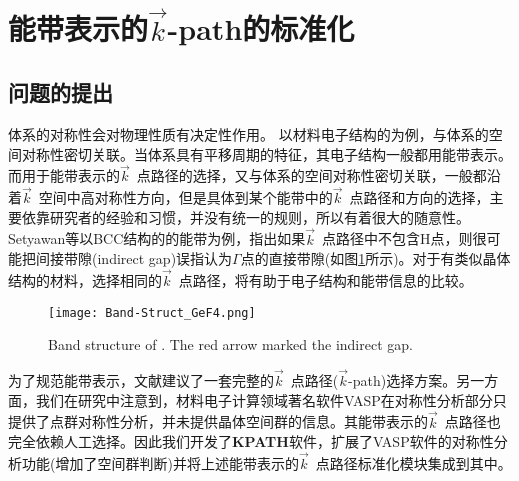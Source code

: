 \section{能带表示的$\vec k$-\rm{path}的标准化}
\subsection{问题的提出}
体系的对称性会对物理性质有决定性作用。%
以材料电子结构的为例，与体系的空间对称性密切关联。当体系具有平移周期的特征，其电子结构一般都用能带表示。而用于能带表示的$\vec k$~点路径的选择，又与体系的空间对称性密切关联，一般都沿着$\vec k$~空间中高对称性方向，但是具体到某个能带中的$\vec k$~点路径和方向的选择，主要依靠研究者的经验和习惯，并没有统一的规则，所以有着很大的随意性。\textrm{Setyawan}等以\textrm{BCC}结构的的能带为例，指出如果$\vec k$~点路径中不包含\textrm{H}点，则很可能把间接带隙(\textrm{indirect gap})误指认为$\Gamma$点的直接带隙(如图\ref{Band_Gap_BCC_GeF4}所示)。对于有类似晶体结构的材料，选择相同的$\vec k$~点路径，将有助于电子结构和能带信息的比较。
\begin{figure}[h!]
\centering
\texttt{[image: Band-Struct\_GeF4.png]}
\caption{\small{\textrm{Band structure of . The red arrow marked the indirect gap.}}}
\label{Band_Gap_BCC_GeF4}
\end{figure}

为了规范能带表示，文献\cite{CMS49-299_2010}建议了一套完整的$\vec k$~点路径($\vec k$-\textrm{path})选择方案。另一方面，我们在研究中注意到，材料电子计算领域著名软件\textrm{VASP}在对称性分析部分只提供了点群对称性分析，并未提供晶体空间群的信息。其能带表示的$\vec k$~点路径也完全依赖人工选择。因此我们开发了\textbf{KPATH}软件，扩展了\textrm{VASP}软件的对称性分析功能(增加了空间群判断)并将上述能带表示的$\vec k$~点路径标准化模块集成到其中。

